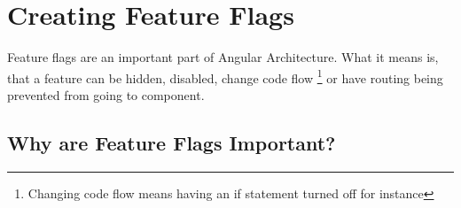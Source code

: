 \maketitle{}
\section{ Creating Feature Flags }

Feature flags are an important part of Angular Architecture. What it means is,
that a feature can be hidden, disabled, change code flow \footnote{Changing code flow means having an if statement turned off for instance}
or have routing being prevented from going to component.

\subsection{ Why are Feature Flags Important? }
